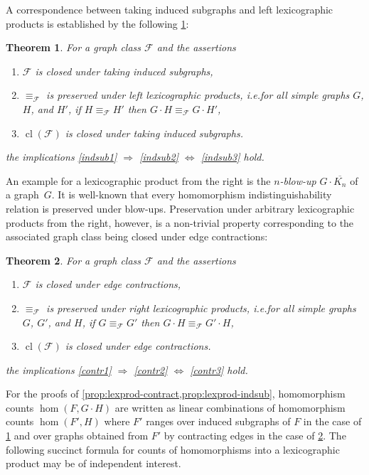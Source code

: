 \documentclass[3p,final]{elsarticle}
\DeclareMathOperator{\cl}{cl}
\newtheorem{theorem}{Theorem}
\begin{document}
	A correspondence between taking induced subgraphs and left lexicographic products is established by the following \cref{prop:lexprod-indsub}:
	
	\begin{theorem} \label{prop:lexprod-indsub}
		For a graph class $\mathcal{F}$ and the assertions
		\begin{enumerate}
			\item $\mathcal{F}$ is closed under taking induced subgraphs,\label{indsub1}
			\item $\equiv_{\mathcal{F}}$ is \emph{preserved under left lexicographic products}, i.e.\@ for all simple graphs $G$, $H$, and $H'$, if $H \equiv_{\mathcal{F}} H'$ then $G \cdot H \equiv_{\mathcal{F}} G \cdot H'$,\label{indsub2}
			\item $\cl(\mathcal{F})$ is closed under taking induced subgraphs.\label{indsub3}
		\end{enumerate}
		the implications \ref{indsub1} $\Rightarrow$ \ref{indsub2} $\Leftrightarrow$ \ref{indsub3} hold.
	\end{theorem}
	

	An example for a lexicographic product from the right is the \emph{$n$-blow-up} $G \cdot \overline{K_n}$ of a graph~$G$.
	It is well-known \cite{lovasz_large_2012} that every homomorphism indistinguishability relation is preserved under blow-ups. 
	Preservation under arbitrary lexicographic products from the right, however, is a non-trivial property corresponding to the associated graph class being closed under edge contractions:

	\begin{theorem} \label{prop:lexprod-contract}
		For a graph class $\mathcal{F}$ and the assertions
		\begin{enumerate}
			\item $\mathcal{F}$ is closed under edge contractions,\label{contr1}
			\item $\equiv_{\mathcal{F}}$ is \emph{preserved under right lexicographic products}, i.e.\@  for all simple graphs $G$, $G'$, and $H$, if $G \equiv_{\mathcal{F}} G'$ then $G \cdot H \equiv_{\mathcal{F}} G' \cdot H$,\label{contr2}
			\item $\cl(\mathcal{F})$ is closed under edge contractions.\label{contr3}
		\end{enumerate}
		the implications \ref{contr1} $\Rightarrow$ \ref{contr2} $\Leftrightarrow$ \ref{contr3} hold.
	\end{theorem}


	For the proofs of \cref{prop:lexprod-contract,prop:lexprod-indsub}, homomorphism counts $\hom(F, G \cdot H)$ are written as linear combinations of homomorphism counts $\hom(F', H)$ where $F'$ ranges over induced subgraphs of $F$ in the case of \cref{prop:lexprod-indsub} and over graphs obtained from $F'$ by contracting edges in the case of \cref{prop:lexprod-contract}.
	The following succinct formula for counts of homomorphisms into a lexicographic product may  be of independent interest.
	
\end{document}
